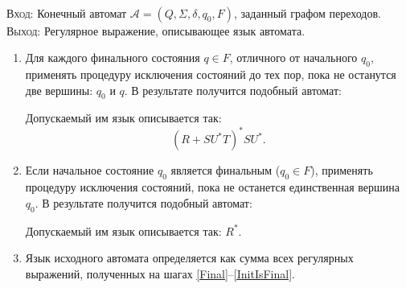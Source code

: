 \begin{Algo}
\nspace\\
\textsc{Вход}: Конечный автомат $\mathcal A = (Q, \Sigma, \delta, q_0, F)$,
заданный графом переходов.\\
\textsc{Выход}: Регулярное выражение, описывающее язык  автомата.
\begin{enumerate}
\renewcommand{\labelenumi}{Шаг \theenumi{}.}
  \item\label{Final} Для каждого финального состояния $q\in F$, отличного от
  начального $q_0$, применять процедуру исключения состояний до тех пор, пока не останутся
  две вершины: $q_0$ и $q$. В результате получится подобный автомат: 
  \begin{center}
    \end{center}
    Допускаемый им язык описывается так:
    $$(R+SU^{\ast}T)^{\ast}SU^{\ast}.$$
    
    \item\label{InitIsFinal} Если начальное состояние $q_0$ является финальным
    ($q_0\in F$), применять процедуру исключения состояний, пока не останется
    единственная вершина $q_0$. В результате получится подобный автомат:
    \begin{center}
    \end{center}
    Допускаемый им язык описывается так: $R^{\ast}$.

    \item Язык исходного автомата определяется как сумма всех регулярных выражений,
    полученных на шагах \eqref{Final}–\eqref{InitIsFinal}.
    \end{enumerate}
\end{Algo}

